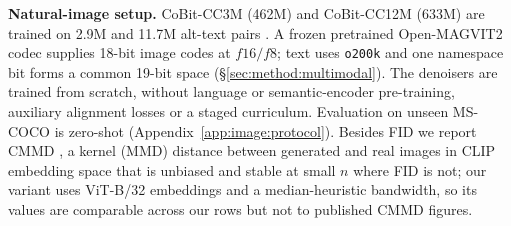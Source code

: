 \textbf{Natural-image setup.} CoBit-CC3M (462M) and CoBit-CC12M (633M) are trained on 2.9M and
11.7M alt-text pairs \citep{image:cc3m,image:cc12m}. A frozen pretrained Open-MAGVIT2 codec
\citep{image:magvit2,image:lfq} supplies 18-bit image codes at $f16/f8$; text uses \texttt{o200k}
and one namespace bit forms a common 19-bit space (\S\ref{sec:method:multimodal}). The denoisers
are trained from scratch, without language or semantic-encoder pre-training, auxiliary alignment
losses or a staged curriculum. Evaluation on unseen MS-COCO \citep{image:mscoco} is zero-shot
(Appendix~\ref{app:image:protocol}). Besides FID we report CMMD \citep{image:cmmd}, a kernel
(MMD) distance between generated and real images in CLIP embedding space that is unbiased and
stable at small $n$ where FID is not; our variant uses ViT-B/32 embeddings and a median-heuristic
bandwidth, so its values are comparable across our rows but not to published CMMD figures.

